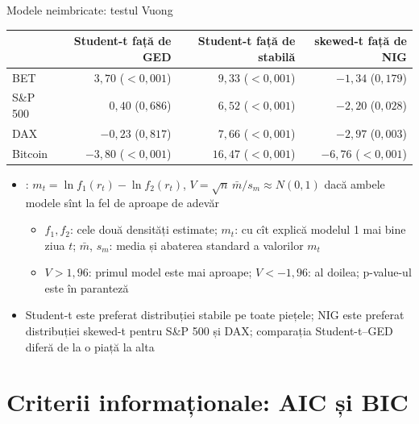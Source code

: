 \begin{frame}{Modele neimbricate: testul Vuong}
\itemsize{\footnotesize}
\begin{center}
\footnotesize
\begin{tabular}{lrrr}
\toprule
& Student-t față de GED & Student-t față de stabilă & skewed-t față de NIG \\
\midrule
BET & $3{,}70$ ($<0{,}001$) & $9{,}33$ ($<0{,}001$) & $-1{,}34$ ($0{,}179$) \\
S\&P 500 & $0{,}40$ ($0{,}686$) & $6{,}52$ ($<0{,}001$) & $-2{,}20$ ($0{,}028$) \\
DAX & $-0{,}23$ ($0{,}817$) & $7{,}66$ ($<0{,}001$) & $-2{,}97$ ($0{,}003$) \\
Bitcoin & $-3{,}80$ ($<0{,}001$) & $16{,}47$ ($<0{,}001$) & $-6{,}76$ ($<0{,}001$) \\
\bottomrule
\end{tabular}
\end{center}
\begin{itemize}
    \item {}: $m_t = \ln f_1(r_t) - \ln f_2(r_t)$, $V = \sqrt{n}\,\bar m / s_m \approx N(0, 1)$ dacă ambele modele sînt la fel de aproape de adevăr
    \begin{itemize}
        \item $f_1, f_2$: cele două densități estimate; $m_t$: cu cît explică modelul 1 mai bine ziua $t$; $\bar m$, $s_m$: media și abaterea standard a valorilor $m_t$
        \item $V > 1{,}96$: primul model este mai aproape; $V < -1{,}96$: al doilea; p-value-ul este în paranteză
    \end{itemize}
    \item Student-t este preferat distribuției stabile pe toate piețele; NIG este preferat distribuției skewed-t pentru S\&P 500 și DAX; comparația Student-t--GED diferă de la o piață la alta
\end{itemize}
\end{frame}


\section{Criterii informaționale: AIC și BIC}

